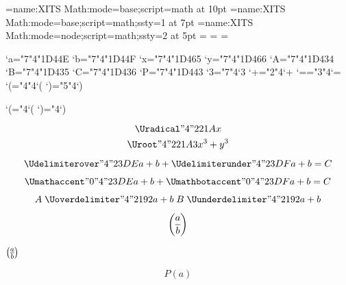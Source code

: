 

\font\4={name:XITS Math:mode=base;script=math} at 10pt
\font\5={name:XITS Math:mode=base;script=math;ssty=1} at 7pt
\font\6={name:XITS Math:mode=node;script=math;ssty=2} at 5pt
=\4 =\5 =\6

\Umathcode`a="7"4"1D44E
\Umathcode`b="7"4"1D44F
\Umathcode`x="7"4"1D465
\Umathcode`y="7"4"1D466
\Umathcode`A="7"4"1D434
\Umathcode`B="7"4"1D435
\Umathcode`C="7"4"1D436
\Umathcode`P="7"4"1D443
\Umathcode`3="7"4`3
\Umathcode`+="2"4`+
\Umathcode`=="3"4`=
\Umathcode`(="4"4`(
\Umathcode`)="5"4`)

\Udelcode`(="4`(
\Udelcode`)="4`)

$$\Uradical "4 "221A {x}$$
$$\Uroot    "4 "221A {3}{x^3+y^3}$$

$$
  \Udelimiterover  "4 "23DE {a+b}
+ \Udelimiterunder "4 "23DF {a+b} = C
$$

$$
  \Umathaccent    "0 "4 "23DE {a+b}
+ \Umathbotaccent "0 "4 "23DF {a+b} = C
$$

$$
A \mathrel{\Uoverdelimiter  "4 "2192 {a+b}}
B \mathrel{\Uunderdelimiter "4 "2192 {a+b}}
$$

$$
{a \overwithdelims() b}
$$


\centerline{$ a \overwithdelims() b $}

$$
P(a)
$$

\bye
